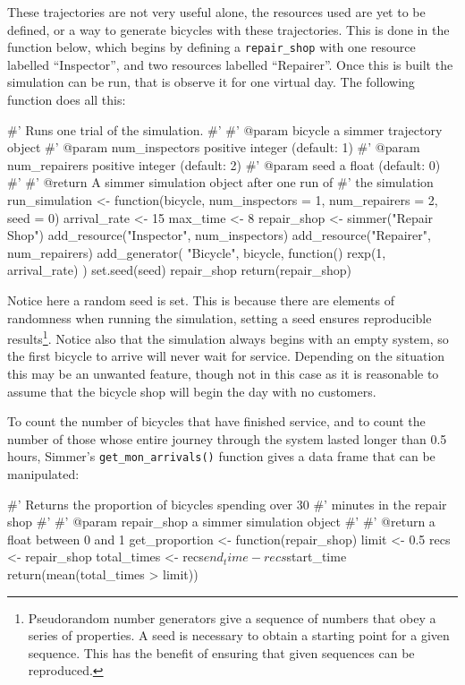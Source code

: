 These trajectories are not very useful alone, the resources used are yet to be defined,
or a way to generate bicycles with these trajectories. This is done in the
function below, which begins by defining a \texttt{repair_shop} with one
resource labelled ``Inspector'', and two resources labelled ``Repairer''.
Once this is built the simulation can be run, that is observe it for one
virtual day. The following function does all this:

\begin{Rin}
#' Runs one trial of the simulation.
#'
#' @param bicycle a simmer trajectory object
#' @param num_inspectors positive integer (default: 1)
#' @param num_repairers positive integer (default: 2)
#' @param seed a float (default: 0)
#'
#' @return A simmer simulation object after one run of
#'         the simulation
run_simulation <- function(bicycle,
                           num_inspectors = 1,
                           num_repairers = 2,
                           seed = 0) {
  arrival_rate <- 15
  max_time <- 8
  repair_shop <-
    simmer("Repair Shop") %
    add_resource("Inspector", num_inspectors) %
    add_resource("Repairer", num_repairers) %
    add_generator(
      "Bicycle", bicycle, function() {
        rexp(1, arrival_rate)
      }
    )
  set.seed(seed)
  repair_shop %
  return(repair_shop)
}
\end{Rin}

Notice here a random seed is set. This is because there are elements of
randomness when running the simulation, setting a seed ensures reproducible
results\footnote{
Pseudorandom number generators give a sequence of numbers that obey a series of
properties. A seed is necessary to obtain a starting point for a given sequence.
This has the benefit of ensuring that given sequences can be reproduced.
}.
Notice also that the simulation always begins with an empty system, so the first
bicycle to arrive will never wait for service. Depending on the situation this
may be an unwanted feature, though not in this case as it is reasonable to
assume that the bicycle shop will begin the day with no customers.

To count the number of bicycles that have finished service, and to
count the number of those whose entire journey through the system lasted longer
than 0.5 hours, Simmer's \texttt{get_mon_arrivals()} function gives a
data frame that can be manipulated:

\begin{Rin}
#' Returns the proportion of bicycles spending over 30
#' minutes in the repair shop
#'
#' @param repair_shop a simmer simulation object
#'
#' @return a float between 0 and 1
get_proportion <- function(repair_shop) {
  limit <- 0.5
  recs <- repair_shop %
  total_times <- recs$end_time - recs$start_time
  return(mean(total_times > limit))
}
\end{Rin}

